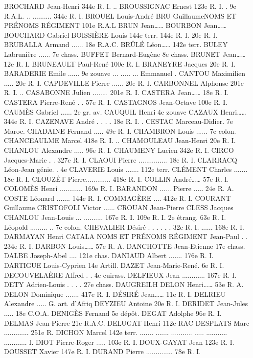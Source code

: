 \documentclass[a4paper,11pt]{book}
\begin{document}
BROCHARD Jean-Henri
344e R. I.
..
BROUSSIGNAC Ernest
123e R. I.
.
9e R.A.L.
..
.......... 344e R. I.
BROUEL Louis-André
BRU GuillaumeNOMS ET PRÉNOMS
RÉGIMENT
101e R.A.L
BRUN Jean……
BOURBON Jean……
BOUCHARD Gabriel
BOISSIÈRE Louis
144e terr.
144e R. I.
20e R. I.
BRUBALLA Armand ...... 18e R.A.C.
BRÛLÉ Léon……
142e terr.
BULEY Labrunière ...... 7e chass.
BUFFET Bernard-Eugène 8e chass.
BRUNET Jean……
12e R. I.
BRUNEAULT Paul-René
100e R. I.
BRANEYRE Jacques
20e R. I.
BARADERIE Emile ......
9e zouave
...
.....
...
Emmanuel
.
CANTOU Maximilien ..... 20e R. I.
CAPDEVILLE Pierre ...... 20e R. I.
CARBONNEL Alphonse
201e R. I.
..
CASABONNE Julien ........ 201e R. I.
CASTERA Jean……
18e R. I.
CASTERA Pierre-René . . 57e R. I.
CASTAGNOS Jean-Octave 100e R. I.
CAUMÈS Gabriel ......
2e gr. av.
CAUQUIL Henri
4e zouave
CAZAUX Henri……
344e R. I.
CAZENAVE André . . . .
18e R. I.
.
CESTAC Marceau-Didier. 7e Maroc.
CHADAINE Fernand ..... 49e R. I.
CHAMBRON Louis ...... 7e colon.
CHANCEAULME Marcel
418e R. I.
..
CHAMOULEAU Jean-Henri 20e R. I.
CHANLOU Alexandre ..... 96e R. I.
CHAUMENY Lucien
342e R. I.
CIRCO Jacques-Marie . . 327e R. I.
CLAOUI Pierre ............... 18e R. I.
CLARRACQ Léon-Jean
génie.
. 4e
CLAVERIE Louis ....... 112e terr.
CLÉMENT Charles ....... 18e R. I.
CLOUZÉT Pierre............. 418e R. I.
COLLIN André……
57e R. I.
COLOMÈS Henri ............ 169e R. I.
BARANDON
......
Pierre ..... 24e R. A.
COSTE Léonard .......
144e R. I.
COMMAGÈRE
.... 412e R. I.
COURANT Guillaume
CRISTOFOLI Victor ......
CROUAN Jean-Pierre
CLESS Jacques
CHANLOU Jean-Louis
...
..........
167e R. I.
109e R. I.
2e étrang.
63e R. I.
Léopold ......... .. 7e colon.
CHEVALIER Désiré . . . . . . 32e R. I.
...... 168e R. I.
DARMAYAN Henri
CATALA
NOMS ET PRÉNOMS
RÉGIMENT
Jean-Paul . . 234e R. I.
DARBON Louis……
57e R. A.
DANCHOTTE Jean-Etienne 17e chass.
DALBE Joseph-Abel .... 121e chas.
DANIAUD Albert ....... 176e R. I.
DARTIGUE Louis-Cyprien 14e Artill.
DAZET Jean-Marie-René. 6e R. I.
DECOUVELAÈRE Alfred . . 4e cuirass.
DELFIEUX Jean ............ 167e R. I.
DETY Adrien-Louis . . . . 27e chass.
DAUGREILH
DELON Henri……
53e R. A.
DELON Dominique ....... 417e R. I.
DÉSIRÉ Jean……
11e R. I.
DELRIEU Alexandre ..... G. art. d'Afriq
DEYZIEU Antoine
20e R. I.
DERIDET Jean-Jules ..... 18e C.O.A.
DENIGÈS Fernand
5e dépôt.
DEGAT Adolphe
96e R. I.
DELMAS Jean-Pierre
21e R.A.C.
DELUGAT Henri
112e RAC
DESPLATS Marc ............. 251e R.
DICHON Marcel
142e terr.
.......
.......
...........
.....
...........
............
I.
DIOT Pierre-Roger ..... 103e R. I.
DOUX-GAYAT Jean
123e R. I.
DOUSSET Xavier
147e R. I.
DURAND Pierre .............. 78e R. I.
\end{document}
